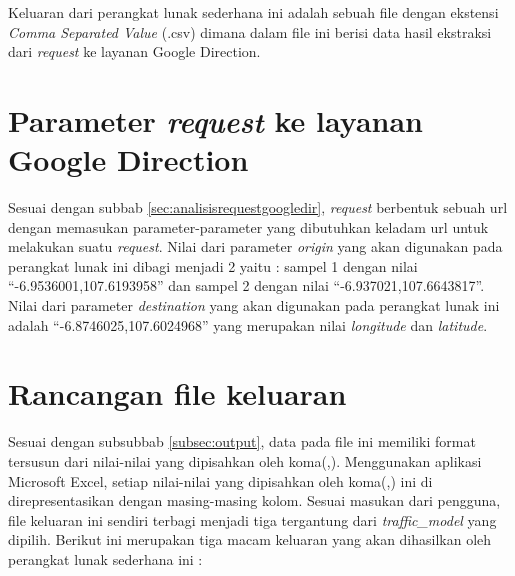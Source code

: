 Keluaran dari perangkat lunak sederhana ini adalah sebuah file dengan ekstensi \textit{Comma Separated Value} (.csv) dimana dalam file ini berisi data hasil ekstraksi dari \textit{request} ke layanan Google Direction.

\section{Parameter \textit{request} ke layanan Google Direction}
\label{sec:parameterrequest}

Sesuai dengan subbab \ref{sec:analisisrequestgoogledir}, \textit{request} berbentuk sebuah url dengan memasukan parameter-parameter yang dibutuhkan keladam url untuk melakukan suatu \textit{request}. Nilai dari parameter \textit{origin} yang akan digunakan pada perangkat lunak ini dibagi menjadi 2 yaitu : sampel 1 dengan nilai "`-6.9536001,107.6193958"' dan sampel 2 dengan nilai "`-6.937021,107.6643817"'. Nilai dari parameter \textit{destination} yang akan digunakan pada perangkat lunak ini adalah "`-6.8746025,107.6024968"' yang merupakan nilai \textit{longitude} dan \textit{latitude}. 


\section{Rancangan file keluaran}
\label{sec:rancanganfile}

Sesuai dengan subsubbab \ref{subsec:output}, data pada file ini memiliki format tersusun dari nilai-nilai yang dipisahkan oleh koma(,). Menggunakan aplikasi Microsoft Excel, setiap nilai-nilai yang dipisahkan oleh koma(,) ini di direpresentasikan dengan masing-masing kolom. Sesuai masukan dari pengguna, file keluaran ini sendiri terbagi menjadi tiga tergantung dari \textit{traffic\_model} yang dipilih. Berikut ini merupakan tiga macam keluaran yang akan dihasilkan oleh perangkat lunak sederhana ini :

